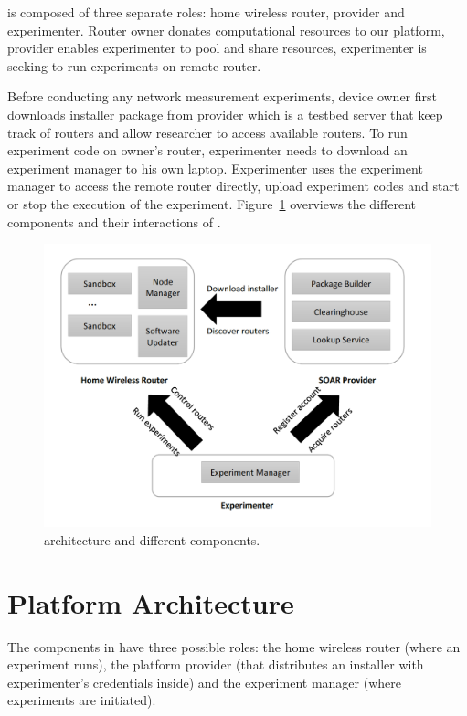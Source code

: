 \sysname is composed of three separate roles: home wireless router, \sysname provider and experimenter. Router owner donates computational resources to our platform, \sysname provider enables experimenter to pool and share resources, experimenter is seeking to run experiments on remote router.

Before conducting any network measurement experiments, device owner first downloads installer package from \sysname provider which is a testbed server that keep track of routers and allow researcher to access available routers. To run experiment code on owner's router, experimenter needs to download an experiment manager to his own laptop. Experimenter uses the experiment manager to access the remote router directly, upload experiment codes and start or stop the execution of the experiment. Figure~\ref{fig-arch} overviews the different components and their interactions of \sysname.

\begin{figure}%
\centering
\includegraphics[width=0.8\columnwidth]{figure/soar-arch.png}
\caption{\sysname architecture and different components.}
\label{fig-arch}
\end{figure}

\section{Platform Architecture}
The components in \sysname have three possible roles: the home wireless router (where an experiment runs), the platform provider (that distributes an installer with experimenter's credentials inside) and the experiment manager (where experiments are initiated).

